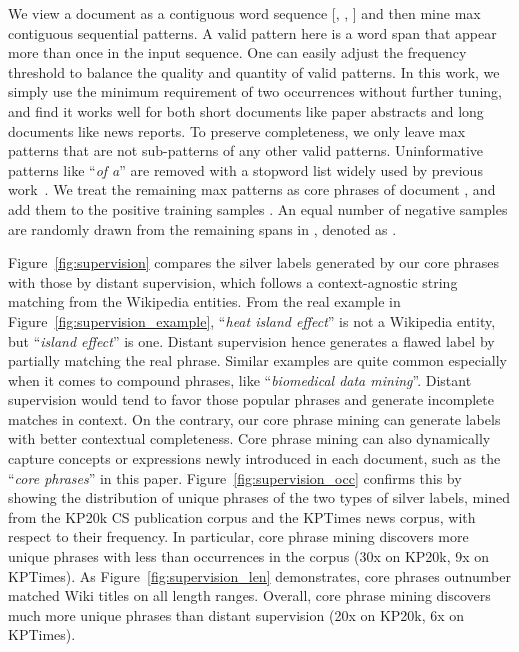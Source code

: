 \documentclass[sigconf]{acmart}
\newcommand{\example}[1]{``\emph{#1}''}
\begin{document}
We view a document  as a contiguous word sequence [, , ] and then mine max contiguous sequential patterns.
A valid pattern here is a word span  that appear more than once in the input sequence.
One can easily adjust the frequency threshold to balance the quality and quantity of valid patterns.
In this work, we simply use the minimum requirement of two occurrences without further tuning, and find it works well for both short documents like paper abstracts and long documents like news reports. 
To preserve completeness, we only leave max patterns that are not sub-patterns of any other valid patterns.
Uninformative patterns like \example{of a} are removed with a stopword list widely used by previous work~\cite{liu2015mining,shang2018automated}.
We treat the remaining max patterns as core phrases of document , and add them to the positive training samples .
An equal number of negative samples are randomly drawn from the remaining spans in , denoted as .

Figure~\ref{fig:supervision} compares the silver labels generated by our core phrases with those by distant supervision, which follows a context-agnostic string matching from the Wikipedia entities.
From the real example in Figure~\ref{fig:supervision_example}, \example{heat island effect} is not a Wikipedia entity, but \example{island effect} is one.
Distant supervision hence generates a flawed label by partially matching the real phrase.
Similar examples are quite common especially when it comes to compound phrases, like \example{biomedical data mining}.
Distant supervision would tend to favor those popular phrases and generate incomplete matches in context.
On the contrary, our core phrase mining can generate labels with better contextual completeness. 
Core phrase mining can also dynamically capture concepts or expressions newly introduced in each document, such as the \example{core phrases} in this paper. 
 Figure~\ref{fig:supervision_occ} confirms this by showing the distribution of unique phrases of the two types of silver labels, mined from the KP20k CS publication corpus and the KPTimes news corpus, with respect to their frequency.
In particular, core phrase mining discovers more unique phrases with less than  occurrences in the corpus (30x on KP20k, 9x on KPTimes).
As Figure~\ref{fig:supervision_len} demonstrates, core phrases outnumber matched Wiki titles on all length ranges.
Overall, core phrase mining discovers much more unique phrases than distant supervision (20x on KP20k, 6x on KPTimes).
\end{document}
